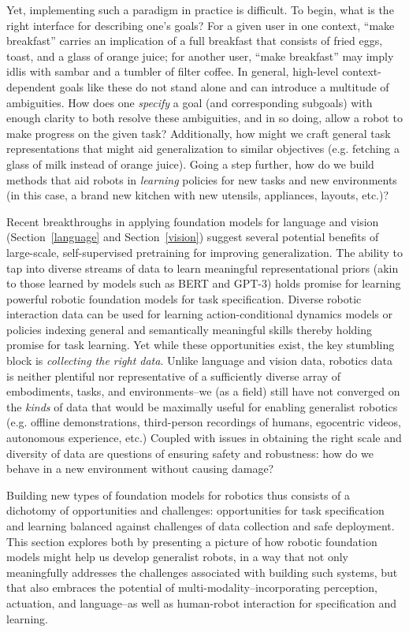 Yet, implementing such a paradigm in practice is difficult. To begin, what is the right interface for describing one's goals? For a given user in one context, ``make breakfast'' carries an implication of a full breakfast that consists of fried eggs, toast, and a glass of orange juice; for another user, ``make breakfast'' may imply idlis with sambar and a tumbler of filter coffee. In general, high-level context-dependent goals like these do not stand alone and can introduce a multitude of ambiguities. How does one \textit{specify} a goal (and corresponding subgoals) with enough clarity to both resolve these ambiguities, and in so doing, allow a robot to make progress on the given task? Additionally, how might we craft general task representations that might aid generalization to similar objectives (e.g. fetching a glass of milk instead of orange juice). Going a step further, how do we build methods that aid robots in \textit{learning} policies for new tasks and new environments (in this case, a brand new kitchen with new utensils, appliances, layouts, etc.)?

Recent breakthroughs in applying foundation models for language and vision (Section~\ref{language} and Section~\ref{vision}) suggest several potential benefits of large-scale, self-supervised pretraining for improving generalization. The ability to tap into diverse streams of data to learn meaningful representational priors (akin to those learned by models such as BERT and GPT-3) holds promise for learning powerful robotic foundation models for task specification. Diverse robotic interaction data can be used for learning action-conditional dynamics models or policies indexing general and semantically meaningful skills thereby holding promise for task learning. Yet while these opportunities exist, the key stumbling block is \textit{collecting the right data}. Unlike language and vision data, robotics data is neither plentiful nor representative of a sufficiently diverse array of embodiments, tasks, and environments--we (as a field) still have not converged on the \textit{kinds} of data that would be maximally useful for enabling generalist robotics (e.g. offline demonstrations, third-person recordings of humans, egocentric videos, autonomous experience, etc.) Coupled with issues in obtaining the right scale and diversity of data are questions of ensuring safety and robustness: how do we behave in a new environment without causing damage?

Building new types of foundation models for robotics thus consists of a dichotomy of opportunities and challenges: opportunities for task specification and learning balanced against challenges of data collection and safe deployment. This section explores both by presenting a picture of how robotic foundation models might help us develop generalist robots, in a way that not only meaningfully addresses the challenges associated with building such systems, but that also embraces the potential of multi-modality--incorporating perception, actuation, and language--as well as human-robot interaction for specification and learning.

